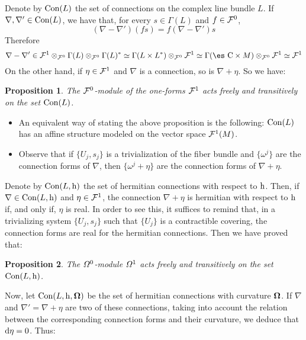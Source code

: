 \documentclass[12pt]{article}
\theoremstyle{plain}
\newtheorem{prop}{Proposition}
\def\d{{\rm d}}
\def\h{{\rm h}}
\def\curv{{\bf \Omega}}
\def\Complex{\mbox{\es C}}
\begin{document}
Denote by ${\rm Con}(L)$ the set of connections on the complex
line bundle $L$. If $\nabla , \nabla ' \in {\rm Con}(L)$, we have
that, for every $s \in \Gamma (L)$ and $f \in {\cal F}^0$, $$
(\nabla - \nabla ')(fs) = f(\nabla - \nabla ')s $$ Therefore $$
\nabla - \nabla '\in {\cal F}^1\otimes_{{\cal F}^0}\Gamma (L)
\otimes_{{\cal F}^0}\Gamma (L)^* \simeq \Gamma (L \times
L^*)\otimes_{{\cal F}^0}{\cal F}^1 \simeq \Gamma (\Complex \times
M)\otimes_{{\cal F}^0}{\cal F}^1 \simeq {\cal F}^1 $$ On the other
hand, if $\eta \in {\cal F}^1$ and $\nabla$ is a connection, so is
$\nabla + \eta$. So we have:

\begin{prop}
The ${\cal F}^0$-module of the one-forms
${\cal F}^1$
acts freely and transitively on the set
${\rm Con}(L)$.
\end{prop}

\begin{itemize}
\item
An equivalent way of stating the above proposition is the following:
${\rm Con}(L)$ has an affine structure modeled on the vector space
${\cal F}^1(M)$.
\item
Observe that if
$\{ U_j,s_j \}$
is a trivialization of the fiber bundle and
$\{ \omega^j \}$
are the connection forms of $\nabla$, then
$\{ \omega^j + \eta \}$
are the connection forms of $\nabla + \eta$.
\end{itemize}

Denote by ${\rm Con}(L,\h )$
the set of hermitian connections with respect to $\h$.
Then, if $\nabla \in {\rm Con}(L,\h )$
and $\eta \in {\cal F}^1$,
the connection $\nabla + \eta$
is hermitian with respect to $\h$
if, and only if, $\eta$ is real.
In order to see this, it suffices to remind that,
in a trivializing system $\{ U_j,s_j \}$
such that $\{ U_j \}$ is a contractible covering,
the connection forms are real for the hermitian connections.
Then we have proved that:

\begin{prop}
The ${\mit\Omega}^0$-module ${\mit\Omega}^1$
acts freely and transitively on the set
${\rm Con}(L,\h )$.
\end{prop}

Now, let ${\rm Con}(L,\h ,\curv )$
be the set of hermitian connections with curvature $\curv $.
If $\nabla$ and $\nabla ' = \nabla + \eta$
are two of these connections, taking into account the relation between
the corresponding connection forms and their curvature,
we deduce that $\d \eta = 0$. Thus:
\end{document}
